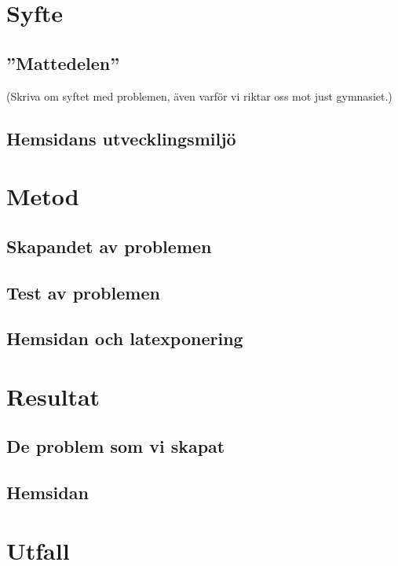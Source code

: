 \documentclass[11 pt,a4paper]{article}
\begin{document}
\section{Syfte}
    \subsection{''Mattedelen''}
    (Skriva om syftet med problemen, även varför vi riktar oss mot just gymnasiet.)
    \subsection{Hemsidans utvecklingsmiljö}
        

\section{Metod}

    \subsection{Skapandet av problemen}
        
    
    \subsection{Test av problemen}

    \subsection{Hemsidan och latexponering}
        
    
\section{Resultat}

    \subsection{De problem som vi skapat}
    
    \subsection{Hemsidan}
        

\section{Utfall}
    \label{sec:Utfall}
    
\end{document}
